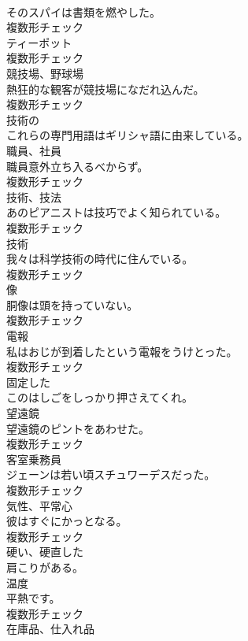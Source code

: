 \documentclass[8pt]{extreport}
\begin{document}
\begin{CJK}{UTF8}{min}
\\	そのスパイは書類を燃やした。	
\\	複数形チェック
\\	[名詞]	ティーポット	
\\	複数形チェック
\\	[名詞]	競技場、野球場	
\\	熱狂的な観客が競技場になだれ込んだ。	
\\	複数形チェック
\\	[形容詞]	技術の	
\\	これらの専門用語はギリシャ語に由来している。	
\\	[名詞]	職員、社員	
\\	職員意外立ち入るべからず。	
\\	複数形チェック
\\	[名詞]	技術、技法	
\\	あのピアニストは技巧でよく知られている。	
\\	複数形チェック
\\	[名詞]	技術	
\\	我々は科学技術の時代に住んでいる。	
\\	複数形チェック
\\	[名詞]	像	
\\	胴像は頭を持っていない。	
\\	複数形チェック
\\	[名詞]	電報	
\\	私はおじが到着したという電報をうけとった。	
\\	複数形チェック
\\	[形容詞]	固定した	
\\	このはしごをしっかり押さえてくれ。	
\\	[名詞]	望遠鏡	
\\	望遠鏡のピントをあわせた。	
\\	複数形チェック
\\	[名詞]	客室乗務員	
\\	ジェーンは若い頃スチュワーデスだった。	
\\	複数形チェック
\\	[名詞]	気性、平常心	
\\	彼はすぐにかっとなる。	
\\	複数形チェック
\\	[形容詞]	硬い、硬直した	
\\	肩こりがある。	
\\	[名詞]	温度	
\\	平熱です。	
\\	複数形チェック
\\	[名詞]	在庫品、仕入れ品	

\end{CJK}
\end{document}
